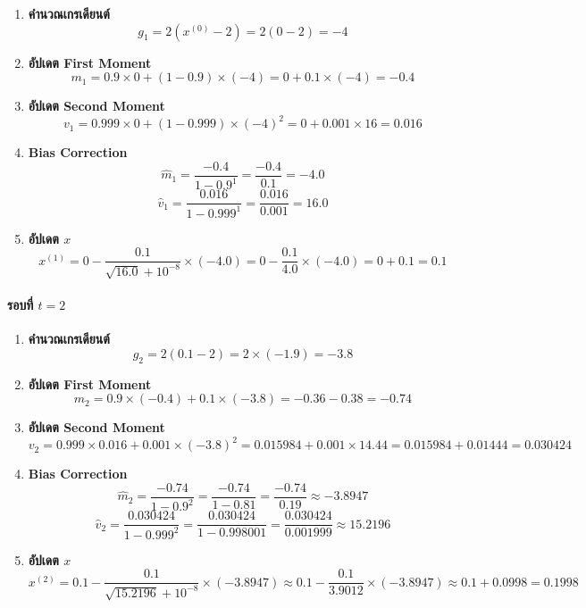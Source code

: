 \begin{enumerate}
    \item \textbf{คำนวณเกรเดียนต์ }
    $$g_1 = 2(x^{(0)} - 2) = 2(0 - 2) = -4$$

    \item \textbf{อัปเดต First Moment } 
    $$m_1 = 0.9 \times 0 + (1 - 0.9) \times (-4) = 0 + 0.1 \times (-4) = -0.4$$

    \item \textbf{อัปเดต Second Moment } 
    $$v_1 = 0.999 \times 0 + (1 - 0.999) \times (-4)^2 = 0 + 0.001 \times 16 = 0.016$$

    \item \textbf{Bias Correction } 
    $$\hat{m}_1 = \frac{-0.4}{1 - 0.9^1} = \frac{-0.4}{0.1} = -4.0$$
    $$\hat{v}_1 = \frac{0.016}{1 - 0.999^1} = \frac{0.016}{0.001} = 16.0$$

    \item \textbf{อัปเดต $x$ } 
    $$x^{(1)} = 0 - \frac{0.1}{\sqrt{16.0} + 10^{-8}} \times (-4.0) = 0 - \frac{0.1}{4.0} \times (-4.0) = 0 + 0.1 = 0.1$$
\end{enumerate}

\paragraph{รอบที่ $t = 2$}

\begin{enumerate}
    \item \textbf{คำนวณเกรเดียนต์ } 
    $$g_2 = 2(0.1 - 2) = 2 \times (-1.9) = -3.8$$

    \item \textbf{อัปเดต First Moment } 
    $$m_2 = 0.9 \times (-0.4) + 0.1 \times (-3.8) = -0.36 - 0.38 = -0.74$$

    \item \textbf{อัปเดต Second Moment } 
    $$v_2 = 0.999 \times 0.016 + 0.001 \times (-3.8)^2 = 0.015984 + 0.001 \times 14.44 = 0.015984 + 0.01444 = 0.030424$$

    \item \textbf{Bias Correction } 
    $$\hat{m}_2 = \frac{-0.74}{1 - 0.9^2} = \frac{-0.74}{1 - 0.81} = \frac{-0.74}{0.19} \approx -3.8947$$
    $$\hat{v}_2 = \frac{0.030424}{1 - 0.999^2} = \frac{0.030424}{1 - 0.998001} = \frac{0.030424}{0.001999} \approx 15.2196$$

    \item \textbf{อัปเดต $x$ } 
    $$x^{(2)} = 0.1 - \frac{0.1}{\sqrt{15.2196} + 10^{-8}} \times (-3.8947) \approx 0.1 - \frac{0.1}{3.9012} \times (-3.8947) \approx 0.1 + 0.0998 = 0.1998$$
\end{enumerate}


